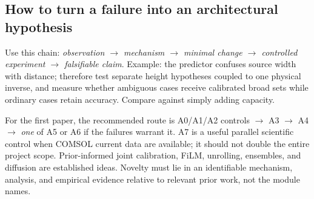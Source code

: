 \subsection{How to turn a failure into an architectural hypothesis}
Use this chain: \emph{observation $\to$ mechanism $\to$ minimal change $\to$ controlled experiment $\to$ falsifiable claim}. Example: the predictor confuses source width with distance; therefore test separate height hypotheses coupled to one physical inverse, and measure whether ambiguous cases receive calibrated broad sets while ordinary cases retain accuracy. Compare against simply adding capacity.

For the first paper, the recommended route is A0/A1/A2 controls $\to$ A3 $\to$ A4 $\to$ \emph{one} of A5 or A6 if the failures warrant it. A7 is a useful parallel scientific control when COMSOL current data are available; it should not double the entire project scope. Prior-informed joint calibration, FiLM, unrolling, ensembles, and diffusion are established ideas. Novelty must lie in an identifiable mechanism, analysis, and empirical evidence relative to relevant prior work, not the module names.

